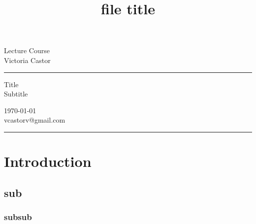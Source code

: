{\setlength{\parindent}{0pt}
\title{file title} %
\fancyhead[C]{}
\begin{minipage}{0.295\textwidth} %
\raggedright
Lecture Course\\ %
\footnotesize %
Victoria Castor %
\medskip\hrule
\end{minipage}
\begin{minipage}{0.4\textwidth} %
\centering 
\large %
Title\\ %
\normalsize %
Subtitle\\ %
\end{minipage}
\begin{minipage}{0.295\textwidth} %
\raggedleft
\today\\ %
\footnotesize %
vcastorv@gmail.com %
\medskip\hrule
\end{minipage}
}

\section{\textbf{Introduction}}

\subsection{sub}

\subsubsection{subsub}

